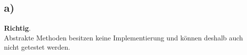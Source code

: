 \subsection*{a)}



\textbf{Richtig}.\\
Abstrakte Methoden besitzen keine Implementierung und können deshalb auch nicht getestet werden.